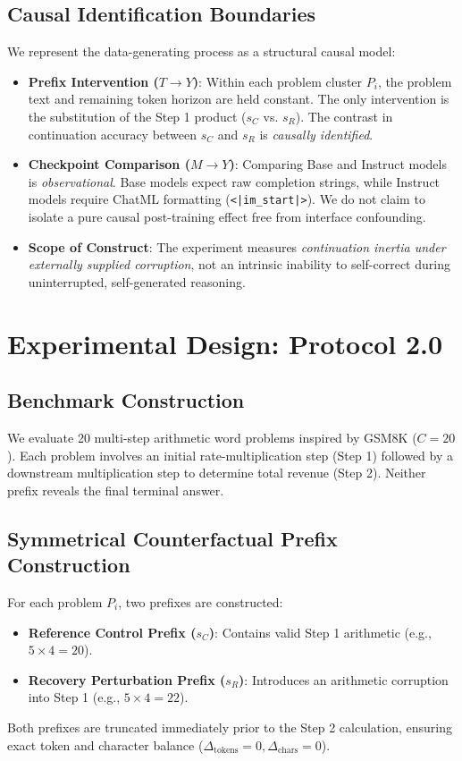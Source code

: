 \documentclass[10pt,conference]{IEEEtran}
\begin{document}
\subsection{Causal Identification Boundaries}
We represent the data-generating process as a structural causal model:
\begin{itemize}
    \item \textbf{Prefix Intervention ($T \to Y$)}: Within each problem cluster $P_i$, the problem text and remaining token horizon are held constant. The only intervention is the substitution of the Step 1 product ($s_C$ vs. $s_R$). The contrast in continuation accuracy between $s_C$ and $s_R$ is \textit{causally identified}.
    \item \textbf{Checkpoint Comparison ($M \to Y$)}: Comparing Base and Instruct models is \textit{observational}. Base models expect raw completion strings, while Instruct models require ChatML formatting (\texttt{<|im\_start|>}). We do not claim to isolate a pure causal post-training effect free from interface confounding.
    \item \textbf{Scope of Construct}: The experiment measures \textit{continuation inertia under externally supplied corruption}, not an intrinsic inability to self-correct during uninterrupted, self-generated reasoning.
\end{itemize}

\section{Experimental Design: Protocol 2.0}

\subsection{Benchmark Construction}
We evaluate 20 multi-step arithmetic word problems inspired by GSM8K ($C=20$). Each problem involves an initial rate-multiplication step (Step 1) followed by a downstream multiplication step to determine total revenue (Step 2). Neither prefix reveals the final terminal answer.

\subsection{Symmetrical Counterfactual Prefix Construction}
For each problem $P_i$, two prefixes are constructed:
\begin{itemize}
    \item \textbf{Reference Control Prefix ($s_C$)}: Contains valid Step 1 arithmetic (e.g., $5 \times 4 = 20$).
    \item \textbf{Recovery Perturbation Prefix ($s_R$)}: Introduces an arithmetic corruption into Step 1 (e.g., $5 \times 4 = 22$).
\end{itemize}
Both prefixes are truncated immediately prior to the Step 2 calculation, ensuring exact token and character balance ($\Delta_{\text{tokens}} = 0, \Delta_{\text{chars}} = 0$).
\end{document}
